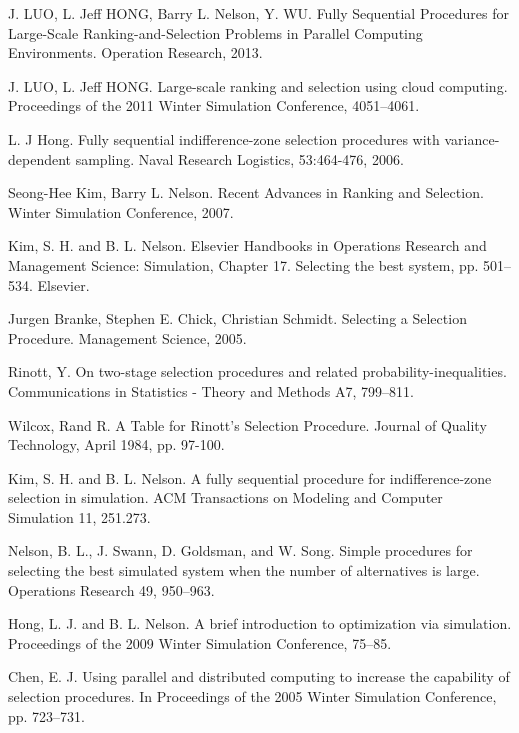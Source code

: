 \documentclass[12pt,a4paper]{report}
\begin{document}
\begin{thebibliography}{99}

 J. LUO, L. Jeff HONG, Barry L. Nelson, Y. WU. Fully Sequential Procedures for Large-Scale Ranking-and-Selection Problems in Parallel Computing Environments. Operation Research, 2013.

 J. LUO, L. Jeff HONG. Large-scale ranking and selection using cloud computing. Proceedings of the 2011 Winter Simulation Conference, 4051–4061.

 L. J Hong. Fully sequential indifference-zone selection procedures with variance-dependent sampling. Naval Research Logistics, 53:464-476, 2006.

 Seong-Hee Kim, Barry L. Nelson. Recent Advances in Ranking and Selection. Winter Simulation Conference, 2007.

 Kim, S. H. and B. L. Nelson. Elsevier Handbooks in Operations Research and Management Science: Simulation, Chapter 17. Selecting the best system, pp. 501–534. Elsevier.

 Jurgen Branke, Stephen E. Chick, Christian Schmidt. Selecting a Selection Procedure. Management Science, 2005.

 Rinott, Y. On two-stage selection procedures and related probability-inequalities. Communications in Statistics - Theory and Methods A7, 799–811.

 Wilcox, Rand R. A Table for Rinott's Selection Procedure. Journal of Quality Technology, April 1984, pp. 97-100.

 Kim, S. H. and B. L. Nelson. A fully sequential procedure for indifference-zone selection in simulation. ACM Transactions on Modeling and Computer Simulation 11, 251.273.

 Nelson, B. L., J. Swann, D. Goldsman, and W. Song. Simple procedures for selecting the best simulated system when the number of alternatives is large. Operations Research 49, 950–963.

 Hong, L. J. and B. L. Nelson. A brief introduction to optimization via simulation. Proceedings of the 2009 Winter Simulation Conference, 75–85.

 Chen, E. J. Using parallel and distributed computing to increase the capability of selection procedures. In Proceedings of the 2005 Winter Simulation Conference, pp. 723–731.


\end{thebibliography}
\end{document}
